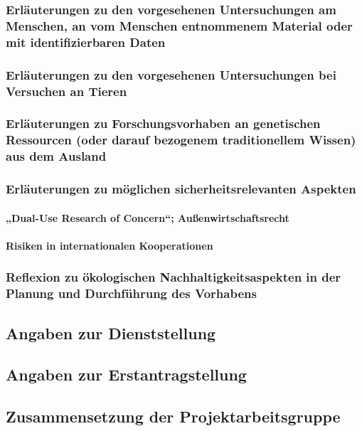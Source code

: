 \documentclass[de]{dfg-proposal}
\begin{document}
\subsubsection{Erläuterungen zu den vorgesehenen Untersuchungen am Menschen, an vom Menschen entnommenem Material oder mit identifizierbaren Daten}

\subsubsection{Erläuterungen zu den vorgesehenen Untersuchungen bei Versuchen an Tieren}

\subsubsection{Erläuterungen zu Forschungsvorhaben an genetischen Ressourcen (oder darauf bezogenem traditionellem Wissen) aus dem Ausland}

\subsubsection{Erläuterungen zu möglichen sicherheitsrelevanten Aspekten}

\paragraph{„Dual-Use Research of Concern“; Außenwirtschaftsrecht}

\paragraph{Risiken in internationalen Kooperationen}

\subsubsection{Reflexion zu ökologischen Nachhaltigkeitsaspekten in der Planung und Durchführung des Vorhabens}

\subsection{Angaben zur Dienststellung}

\subsection{Angaben zur Erstantragstellung}

\subsection{Zusammensetzung der Projektarbeitsgruppe}
\end{document}
